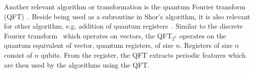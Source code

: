Another relevant algorithm or transformation is the quantum Fourier transform (QFT)~\cite{Copp02}. Beside being used as a subroutine in Shor's algorithm, it is also relevant for other algorithm, e.g. addition of quantum registers~\cite{Drap00}. Similar to the discrete Fourier transform~\cite{Wino78} which operates on vectors, the QFT$_{2^n}$ operates on the quantum equivalent of vector, quantum registers, of size $n$. Registers of size $n$ consist of $n$ qubits. From the register, the QFT extracts periodic features which are then used by the algorithms using the QFT.

